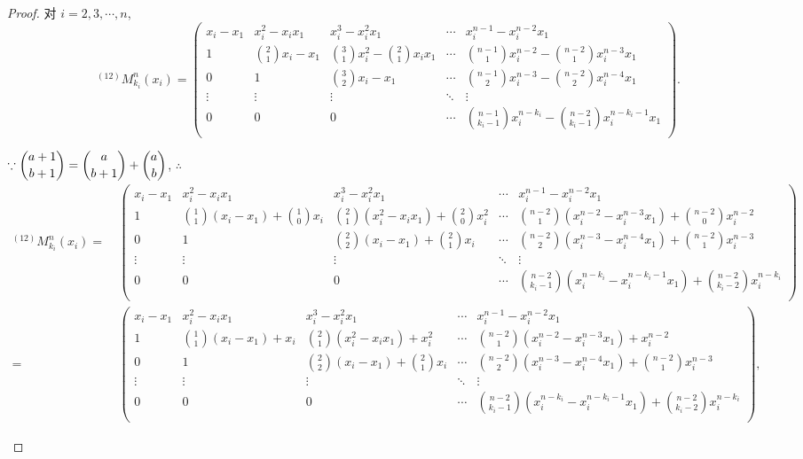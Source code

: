 \documentclass{ctexart}
\begin{document}
\begin{proof}
    对 $i=2,3,\cdots,n$,
    \[^{(12)}M_{k_i}^n(x_i)=\begin{pmatrix}
        x_i-x_1 & x_i^2-x_ix_1 & x_i^3-x_i^2x_1 & \cdots & x_i^{n-1}-x_i^{n-2}x_1 \\[4pt]
        1 & \binom{2}{1}x_i-x_1 & \binom{3}{1}x_i^2-\binom{2}{1}x_ix_1 & \cdots & \binom{n-1}{1}x_i^{n-2}-\binom{n-2}{1}x_i^{n-3}x_1 \\[10pt]
        0 & 1 & \binom{3}{2}x_i-x_1 & \cdots & \binom{n-1}{2}x_i^{n-3}-\binom{n-2}{2}x_i^{n-4}x_1 \\
        \vdots & \vdots & \vdots & \ddots & \vdots \\[4pt]
        0 & 0 & 0 & \cdots & \binom{n-1}{k_i-1}x_i^{n-k_i}-\binom{n-2}{k_i-1}x_i^{n-k_i-1}x_1 \\
    \end{pmatrix}.\]
    \begin{landscape}
        $\because\dbinom{a+1}{b+1}=\dbinom{a}{b+1}+\dbinom{a}{b}$, $\therefore$
        \begin{align*}
            ^{(12)}M_{k_i}^n(x_i)= & \ \begin{pmatrix}
                x_i-x_1 & x_i^2-x_ix_1 & x_i^3-x_i^2x_1 & \cdots & x_i^{n-1}-x_i^{n-2}x_1 \\[4pt]
                1 & \binom{1}{1}(x_i-x_1)+\binom{1}{0}x_i & \binom{2}{1}(x_i^2-x_ix_1)+\binom{2}{0}x_i^2 & \cdots & \binom{n-2}{1}(x_i^{n-2}-x_i^{n-3}x_1)+\binom{n-2}{0}x_i^{n-2} \\[10pt]
                0 & 1 & \binom{2}{2}(x_i-x_1)+\binom{2}{1}x_i & \cdots & \binom{n-2}{2}(x_i^{n-3}-x_i^{n-4}x_1)+\binom{n-2}{1}x_i^{n-3} \\
                \vdots & \vdots & \vdots & \ddots & \vdots \\[4pt]
                0 & 0 & 0 & \cdots & \binom{n-2}{k_i-1}(x_i^{n-k_i}-x_i^{n-k_i-1}x_1)+\binom{n-2}{k_i-2}x_i^{n-k_i} \\
            \end{pmatrix} \\
            = & \ \begin{pmatrix}
                x_i-x_1 & x_i^2-x_ix_1 & x_i^3-x_i^2x_1 & \cdots & x_i^{n-1}-x_i^{n-2}x_1 \\[4pt]
                1 & \binom{1}{1}(x_i-x_1)+x_i & \binom{2}{1}(x_i^2-x_ix_1)+x_i^2 & \cdots & \binom{n-2}{1}(x_i^{n-2}-x_i^{n-3}x_1)+x_i^{n-2} \\[10pt]
                0 & 1 & \binom{2}{2}(x_i-x_1)+\binom{2}{1}x_i & \cdots & \binom{n-2}{2}(x_i^{n-3}-x_i^{n-4}x_1)+\binom{n-2}{1}x_i^{n-3} \\
                \vdots & \vdots & \vdots & \ddots & \vdots \\[4pt]
                0 & 0 & 0 & \cdots & \binom{n-2}{k_i-1}(x_i^{n-k_i}-x_i^{n-k_i-1}x_1)+\binom{n-2}{k_i-2}x_i^{n-k_i} \\
            \end{pmatrix},
        \end{align*}
    \end{landscape}


\end{proof}
\end{document}
